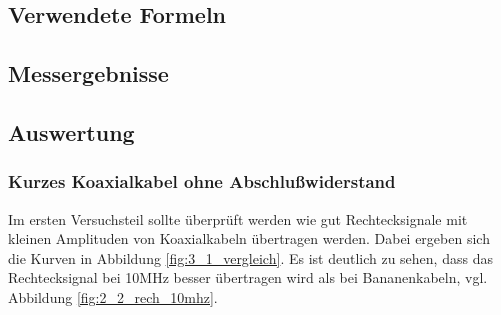 \documentclass[12pt,a4paper]{article}
\begin{document}
\subsection{Verwendete Formeln}
\subsection{Messergebnisse}
\subsection{Auswertung}

\subsubsection{Kurzes Koaxialkabel ohne Abschlußwiderstand}
Im ersten Versuchsteil sollte überprüft werden wie gut Rechtecksignale mit kleinen Amplituden von Koaxialkabeln übertragen werden. Dabei ergeben sich die Kurven in Abbildung \ref{fig:3_1_vergleich}. Es ist deutlich zu sehen, dass das Rechtecksignal bei 10MHz besser übertragen wird als bei Bananenkabeln, vgl. Abbildung \ref{fig:2_2_rech_10mhz}.
\end{document}
